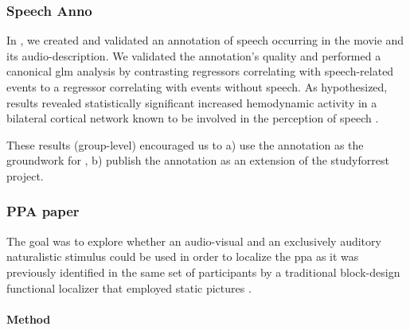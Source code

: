 

\subsubsection{Speech Anno}


In \citep{haeusler2021speechanno}, we created and validated an annotation of
speech occurring in the movie and its audio-description.
We validated the annotation's quality \citep{haeusler2021speechanno} and
performed a canonical \ac{glm} analysis by contrasting regressors correlating
with speech-related events to a regressor correlating with events without
speech.
As hypothesized, results revealed statistically significant increased
hemodynamic activity in a bilateral cortical network known to be involved in the
perception of speech \citep[e.g.,][]{friederici2011brain, wilson2008beyond}.

These results (group-level) encouraged us to a) use the annotation as the
groundwork for \citep{haeusler2022processing}, b) publish the annotation as an
extension of the studyforrest project.


\subsubsection{PPA paper}




The goal \citep{haeusler2022processing} was to explore whether an
audio-visual and an exclusively auditory naturalistic stimulus could be used in
order to localize the \ac{ppa} as it was previously identified in the same set
of participants by a traditional block-design functional localizer that employed
static pictures \citep{sengupta2016extension}.



\paragraph{Method}


